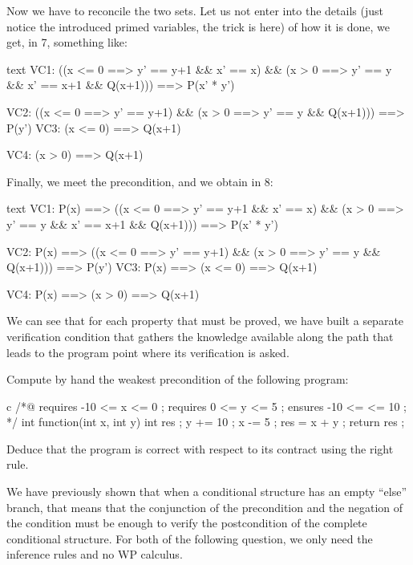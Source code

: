 Now we have to reconcile the two sets. Let us not enter into the details (just
notice the introduced primed variables, the trick is here) of how it is done, we
get, in 7, something like:
\begin{CodeBlock}{text}
  VC1:
    ((x <= 0 ==> y' == y+1 && x' == x) &&
     (x >  0 ==> y' == y   && x' == x+1 && Q(x+1))) ==>
       P(x' * y')

  VC2:
    ((x <= 0 ==> y' == y+1) &&
     (x >  0 ==> y' == y    && Q(x+1))) ==>
       P(y')
  VC3:
    (x <= 0) ==> Q(x+1)

  VC4:
    (x >  0) ==> Q(x+1)
\end{CodeBlock}


Finally, we meet the precondition, and we obtain in 8:
\begin{CodeBlock}{text}
  VC1:
    P(x) ==>
      ((x <= 0 ==> y' == y+1 && x' == x) &&
       (x >  0 ==> y' == y   && x' == x+1 && Q(x+1))) ==>
         P(x' * y')

  VC2:
    P(x) ==>
      ((x <= 0 ==> y' == y+1) &&
       (x >  0 ==> y' == y    && Q(x+1))) ==>
         P(y')
  VC3:
    P(x) ==> (x <= 0) ==> Q(x+1)

  VC4:
    P(x) ==> (x >  0) ==> Q(x+1)
\end{CodeBlock}


We can see that for each property that must be proved, we have built a separate
verification condition that gathers the knowledge available along the path that
leads to the program point where its verification is asked.







Compute by hand the weakest precondition of the following program:


\begin{CodeBlock}{c}
/*@
  requires -10 <= x <= 0 ;
  requires 0 <= y <= 5 ;
  ensures -10 <= \result <= 10 ;
*/
int function(int x, int y){
  int res ;
  y += 10 ;
  x -= 5 ;
  res = x + y ;
  return res ;
}
\end{CodeBlock}


Deduce that the program is correct with respect to its contract using the
right rule.




We have previously shown that when a conditional structure has an empty ``else''
branch, that means that the conjunction of the precondition and the negation
of the condition must be enough to verify the postcondition of the complete
conditional structure.
For both of the following question, we only need the inference rules and
no WP calculus.

